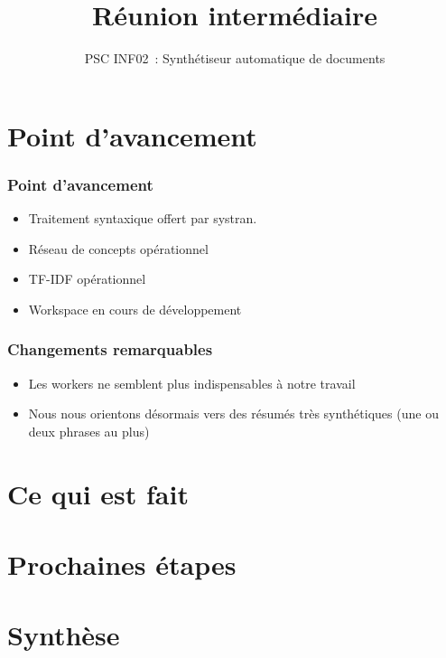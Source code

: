 \documentclass{beamer}
\title{Réunion intermédiaire}
\subtitle{PSC INF02~: Synthétiseur automatique de documents}
\author{}
\institute{École polytechnique}
\date{}
\begin{document}
\begin{frame}
  \titlepage{}
\end{frame}




\section{Point d'avancement}

\begin{frame}
\frametitle{Point d'avancement}
	\begin{block}
		\begin{itemize}
			\item Traitement syntaxique offert par systran.
			\item Réseau de concepts opérationnel
			\item TF-IDF opérationnel
			\item Workspace en cours de développement
		\end{itemize}
	\end{block}
\end{frame}

\begin{frame}
\frametitle{Changements remarquables}
	\begin{block}
		\begin{itemize}
			\item Les workers ne semblent plus indispensables à notre travail
			\item Nous nous orientons désormais vers des résumés très synthétiques (une ou deux phrases au plus)
		\end{itemize}
	\end{block}
\end{frame}

\section{Ce qui est fait}

\section{Prochaines étapes}


\section{Synthèse}
\end{document}
